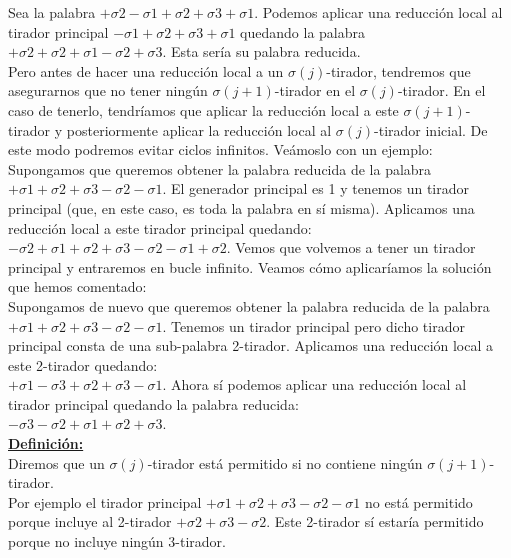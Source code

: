 \documentclass[14pt]{extarticle}
\begin{document}
Sea la palabra $+\sigma2-\sigma1+\sigma2+\sigma3+\sigma1$. Podemos aplicar una reducción local al tirador principal $-\sigma1+\sigma2+\sigma3+\sigma1$ quedando la palabra $+\sigma2+\sigma2+\sigma1-\sigma2+\sigma3$. Esta sería su palabra reducida.\\

Pero antes de hacer una reducción local a un $\sigma(j)$-tirador, tendremos que asegurarnos que no tener ningún $\sigma(j+1)$-tirador en el $\sigma(j)$-tirador. En el caso de tenerlo, tendríamos que aplicar la reducción local a este $\sigma(j+1)$-tirador y posteriormente aplicar la reducción local al $\sigma(j)$-tirador inicial. De este modo podremos evitar ciclos infinitos. Veámoslo con un ejemplo:\\

Supongamos que queremos obtener la palabra reducida de la palabra $+\sigma1+\sigma2+\sigma3-\sigma2-\sigma1$. El generador principal es 1 y tenemos un tirador principal (que, en este caso, es toda la palabra en sí misma). Aplicamos una reducción local a este tirador principal quedando: \\
$-\sigma2+\sigma1+\sigma2+\sigma3-\sigma2-\sigma1+\sigma2$.
Vemos que volvemos a tener un tirador principal y entraremos en bucle infinito. Veamos cómo aplicaríamos la solución que hemos comentado:\\

Supongamos de nuevo que queremos obtener la palabra reducida de la palabra $+\sigma1+\sigma2+\sigma3-\sigma2-\sigma1$. Tenemos un tirador principal pero dicho tirador principal consta de una sub-palabra 2-tirador. Aplicamos una reducción local a este 2-tirador quedando:\\
$+\sigma1-\sigma3+\sigma2+\sigma3-\sigma1$. Ahora sí podemos aplicar una reducción local al tirador principal quedando la palabra reducida: \\
$-\sigma3-\sigma2+\sigma1+\sigma2+\sigma3$.\\

\underline{\textbf{Definición:}} \\
Diremos que un  $\sigma(j)$-tirador está permitido si no contiene ningún $\sigma(j+1)$-tirador.\\

Por ejemplo el tirador principal $+\sigma1+\sigma2+\sigma3-\sigma2-\sigma1$ no está permitido porque incluye al 2-tirador $+\sigma2+\sigma3-\sigma2$. Este 2-tirador sí estaría permitido porque no incluye ningún 3-tirador. \\
\end{document}
